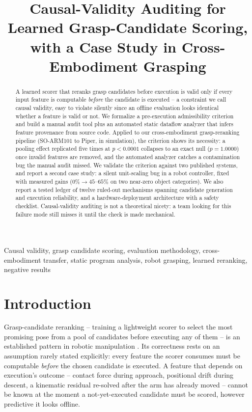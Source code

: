 \documentclass[journal]{IEEEtran}
\title{Causal-Validity Auditing for Learned Grasp-Candidate Scoring,\\
with a Case Study in Cross-Embodiment Grasping}
\begin{document}
\maketitle
\thispagestyle{empty}
\pagestyle{empty}

\begin{abstract}
A learned scorer that reranks grasp candidates before execution is valid
only if every input feature is computable \emph{before} the candidate is
executed -- a constraint we call causal validity, easy to violate
silently since an offline evaluation looks identical whether a feature is
valid or not. We formalize a pre-execution admissibility criterion and
build a manual audit tool plus an automated static dataflow analyzer that
infers feature provenance from source code. Applied to our
cross-embodiment grasp-reranking pipeline (SO-ARM101 to Piper, in
simulation), the criterion shows its necessity: a pooling effect
replicated five times at $p{<}0.0001$ collapses to an exact null
($p{=}1.0000$) once invalid features are removed, and the automated
analyzer catches a contamination bug the manual audit missed. We
validate the criterion against two published systems, and report a
second case study: a silent unit-scaling bug in a robot controller,
fixed with measured gains ($0\%\rightarrow45$--$65\%$ on two near-zero
object categories). We also report a tested ledger of twelve ruled-out
mechanisms spanning candidate generation and execution reliability, and
a hardware-deployment architecture with a safety checklist.
Causal-validity auditing is not a theoretical nicety: a team looking for
this failure mode still misses it until the check is made mechanical.
\end{abstract}

\begin{IEEEkeywords}
Causal validity, grasp candidate scoring, evaluation methodology,
cross-embodiment transfer, static program analysis, robot grasping,
learned reranking, negative results
\end{IEEEkeywords}

\section{Introduction}

Grasp-candidate reranking -- training a lightweight scorer to select the
most promising pose from a pool of candidates before executing any of
them -- is an established pattern in robotic manipulation
\cite{mahler2017dexnet,graspgen2025}. Its correctness rests on an
assumption rarely stated explicitly: every feature the scorer consumes
must be computable \emph{before} the chosen candidate is executed. A
feature that depends on execution's outcome -- contact force during
approach, positional drift during descent, a kinematic residual re-solved
after the arm has already moved -- cannot be known at the moment a
not-yet-executed candidate must be scored, however predictive it looks
offline.
\end{document}
